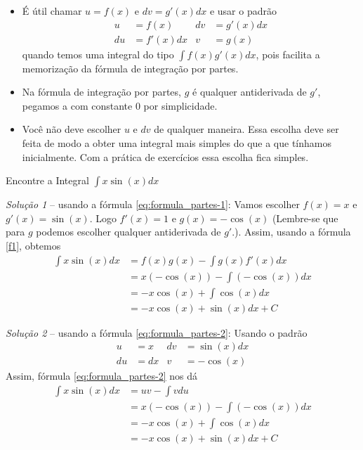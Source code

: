\begin{itemize}
  \item É útil chamar $u=f(x)$ e $dv=g'(x)dx$ e usar o padrão
    \begin{align*}
      u  & = f(x)    &  dv & = g'(x)dx \\
      du & = f'(x)dx &  v  & = g(x)
    \end{align*}
    quando temos uma integral do tipo $\int f(x)g'(x)dx$,
    pois facilita a memorização da fórmula de integração por partes.

  \item Na fórmula de integração por partes, $g$ é qualquer
    antiderivada de $g'$, pegamos a com constante $0$ por simplicidade.

  \item Você não deve escolher $u$ e $dv$ de qualquer maneira.
    Essa escolha deve ser feita de modo a obter uma integral mais
    simples do que a que tínhamos inicialmente. Com a prática de
    exercícios essa escolha fica simples.
\end{itemize}

\begin{example}
  Encontre a Integral \(\int x \sin(x)dx\)

  \solution
  \emph{Solução 1} -- usando a fórmula \eqref{eq:formula_partes-1}:
  Vamos escolher $f(x)=x$ e $g'(x)= \sin(x)$.
  Logo $f'(x)=1$ e $g(x)= -\cos(x)$ (Lembre-se que para $g$
  podemos escolher qualquer antiderivada de $g'$.).
  Assim, usando a fórmula \ref{f1}, obtemos
  \begin{align*}
    \int x\sin(x)dx
    & = f(x)g(x)- \int g(x)f'(x)dx \\
    & = x(-\cos(x))- \int (-\cos(x))dx \\
    & = -x \cos(x) + \int \cos(x) dx \\
    & = -x \cos(x) + \sin(x) dx + C
  \end{align*}

  \emph{Solução 2} -- usando a fórmula \eqref{eq:formula_partes-2}:
  Usando o padrão
  \begin{align*}
    u  & =  x & dv & = \sin(x) dx \\
    du & = dx & v  & = -\cos(x)
  \end{align*}
  Assim, fórmula \eqref{eq:formula_partes-2} nos dá
  \begin{align*}
    \int x\sin(x)dx
    & = uv- \int vdu \\
    & = x(-\cos(x))- \int (-\cos(x))dx \\
    & = -x \cos(x) + \int \cos(x) dx \\
    & = -x \cos(x) + \sin(x) dx + C
  \end{align*}
\end{example}

